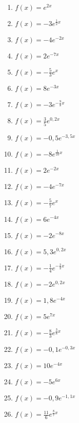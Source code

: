 \newpage
\begin{Exercise}[title={Bestimme den y-Achsenabschnitt, skizziere das Schaubild, gib die Asymptote, das Verhalten für \(x\rightarrow \pm\infty\) und die Monotonie an}, label=eFktA1]\\
	\begin{minipage}{\textwidth}
		\begin{minipage}{0.49\textwidth}
			\begin{enumerate}[label=\alph*)]
				\item \(f(x)=e^{2x}\)
				\item \(f(x)=-3e^{\frac{1}{2}x}\)
				\item \(f(x)=-4e^{-2x}\)
				\item \(f(x)=2e^{-7x}\)
				\item \(f(x)=-\frac{5}{3}e^{x}\)
				\item \(f(x)=8e^{-3x}\)
				\item \(f(x)=-3e^{-\frac{9}{8}x}\)
				\item \(f(x)=\frac{3}{5}e^{0,2x}\)
				\item \(f(x)=-0,5e^{-3,5x}\)
				\item \(f(x)=-8e^{\frac{1}{10}x}\)
				\item \(f(x)=2e^{-2x}\)
				\item \(f(x)=-4e^{-7x}\)
				\item \(f(x)=-\frac{5}{7}e^{x}\)
			\end{enumerate}
		\end{minipage}
		\begin{minipage}{0.49\textwidth}
			\begin{enumerate}[label=\alph*)]
				\setcounter{enumi}{13}
				\item \(f(x)=6e^{-4x}\)
				\item \(f(x)=-2e^{-8x}\)
				\item \(f(x)=5,3e^{0,2x}\)
				\item \(f(x)=-\frac{1}{4}e^{-\frac{2}{3}x}\)
				\item \(f(x)=-2e^{0,2x}\)
				\item \(f(x)=1,8e^{-4x}\)
				\item \(f(x)=5e^{7x}\)
				\item \(f(x)=-\frac{8}{3}e^{\frac{3}{8}x}\)
				\item \(f(x)=-0,1e^{-0,3x}\)
				\item \(f(x)=10e^{-4x}\)
				\item \(f(x)=-5e^{6x}\)
				\item \(f(x)=-0,9e^{-1,1x}\)
				\item \(f(x)=\frac{11}{6}e^{\frac{8}{7}x}\)
			\end{enumerate}
		\end{minipage}
	\end{minipage}
\end{Exercise}
